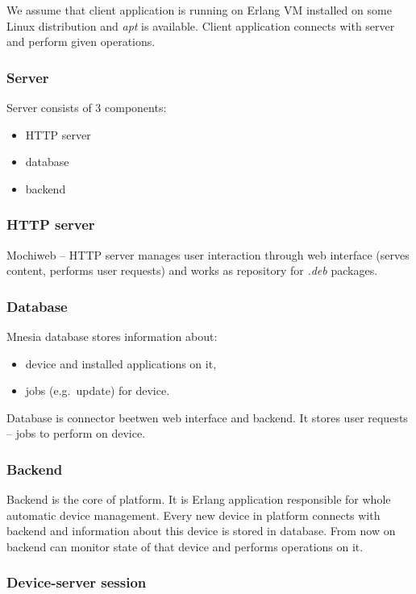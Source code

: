We assume that client application is running on Erlang VM installed on some Linux distribution and
\emph{apt} is available. Client application connects with server and perform given operations.


\subsubsection*{Server}

Server consists of 3 components:
\begin{itemize}
  \item HTTP server
  \item database
  \item backend
\end{itemize}


\subsubsection*{HTTP server}

Mochiweb -- HTTP server manages user interaction through web interface (serves content, performs user requests)
and works as repository for \emph{.deb} packages.

\subsubsection*{Database}

Mnesia database stores information about:
\begin{itemize}
  \item device and installed applications on it,
  \item jobs (e.g.\ update) for device.
\end{itemize}

\noindent Database is connector beetwen web interface and backend. It stores user requests -- jobs to perform
on device.


\subsubsection*{Backend}

Backend is the core of platform. It is Erlang application responsible for whole automatic device
management. Every new device in platform connects with backend and information about this device is stored in database.
From now on backend can monitor state of that device and performs operations on it.

\subsubsection{Device-server session}

